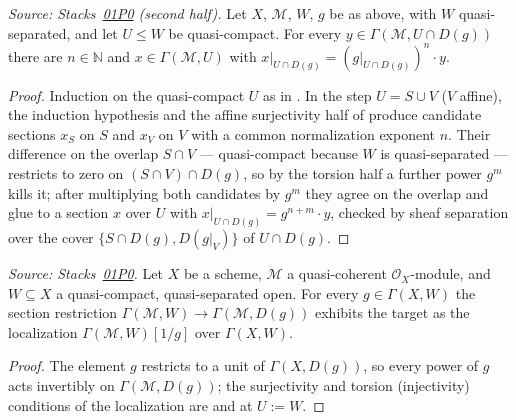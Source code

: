 \begin{lemma}
  \label{lem:qcqs_section_localization_surj}
  \leanok
  \textit{Source: Stacks~\href{https://stacks.math.columbia.edu/tag/01P0}{01P0}
  (second half).}
  Let $X$, $\mathcal{M}$, $W$, $g$ be as above, with $W$ quasi-separated, and
  let $U \le W$ be quasi-compact. For every
  $y \in \Gamma(\mathcal{M}, U \cap D(g))$ there are $n \in \mathbb{N}$ and
  $x \in \Gamma(\mathcal{M}, U)$ with
  $x|_{U \cap D(g)} = (g|_{U \cap D(g)})^n \cdot y$.
\end{lemma}
\begin{proof}
  \leanok
  Induction on the quasi-compact $U$ as in
  . In the step $U = S \cup V$
  ($V$ affine), the induction hypothesis and the affine surjectivity half of
   produce candidate sections
  $x_S$ on $S$ and $x_V$ on $V$ with a common normalization exponent $n$.
  Their difference on the overlap $S \cap V$ --- quasi-compact because $W$ is
  quasi-separated --- restricts to zero on $(S \cap V) \cap D(g)$, so by the
  torsion half a further power $g^m$ kills it; after multiplying both
  candidates by $g^m$ they agree on the overlap and glue to a section $x$
  over $U$ with $x|_{U \cap D(g)} = g^{n+m} \cdot y$, checked by sheaf
  separation over the cover $\{S \cap D(g), D(g|_V)\}$ of $U \cap D(g)$.
\end{proof}

\begin{lemma}
  \label{lem:qcqs_section_localization}
  \leanok
  \textit{Source: Stacks~\href{https://stacks.math.columbia.edu/tag/01P0}{01P0}.}
  Let $X$ be a scheme, $\mathcal{M}$ a quasi-coherent $\mathcal{O}_X$-module,
  and $W \subseteq X$ a quasi-compact, quasi-separated open. For every
  $g \in \Gamma(X, W)$ the section restriction
  $\Gamma(\mathcal{M}, W) \to \Gamma(\mathcal{M}, D(g))$ exhibits the target
  as the localization $\Gamma(\mathcal{M}, W)[1/g]$ over $\Gamma(X, W)$.
\end{lemma}
\begin{proof}
  \leanok
  The element $g$ restricts to a unit of $\Gamma(X, D(g))$, so every power of
  $g$ acts invertibly on $\Gamma(\mathcal{M}, D(g))$; the surjectivity and
  torsion (injectivity) conditions of the localization are
   and
   at $U := W$.
\end{proof}

